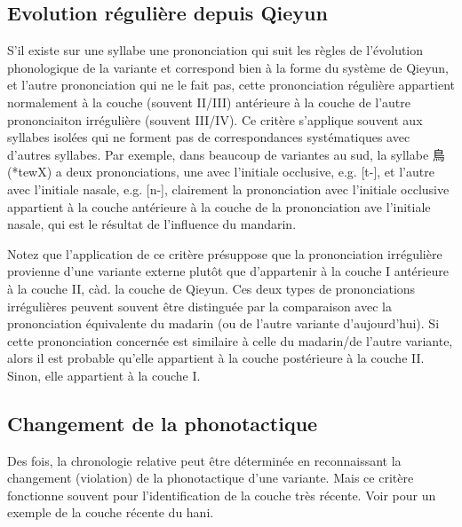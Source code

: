 \documentclass{scrbook}
\newcounter{c}[subsubsection]
\begin{document}
\begin{sloppypar}
\subsection{Evolution régulière depuis Qieyun}
S'il existe sur une syllabe une prononciation qui suit les règles de l'évolution phonologique de la variante et correspond bien à la forme du système de Qieyun, et l'autre prononciation qui ne le fait pas, cette prononciation régulière appartient normalement à la couche (souvent II/III) antérieure à la couche  de l'autre prononciaiton irrégulière (souvent III/IV). Ce critère s'applique souvent aux syllabes isolées qui ne forment pas de correspondances systématiques avec d'autres syllabes. Par exemple, dans beaucoup de variantes au sud, la syllabe 鳥 (*tewX) a deux prononciations, une avec l'initiale occlusive, e.g. [t-], et l'autre avec l'initiale nasale, e.g. [n-], clairement la prononciation avec l'initiale occlusive appartient à la couche antérieure à la couche de la prononciation ave l'initiale nasale, qui est le résultat de l'influence du mandarin. 

Notez que l'application de ce critère présuppose que la prononciation irrégulière provienne d'une variante externe plutôt que d'appartenir à la couche I antérieure à la couche II, càd. la couche de Qieyun. Ces deux types de prononciations irrégulières peuvent souvent être distinguée par la comparaison  avec la prononciation équivalente du madarin (ou de l'autre variante d'aujourd'hui). Si cette prononciation concernée est similaire à celle du madarin/de l'autre variante, alors il est probable qu'elle appartient à la couche postérieure à la couche II. Sinon, elle appartient à la couche I.

\subsection{Changement de la phonotactique}
Des fois, la chronologie relative peut être déterminée en reconnaissant la changement (violation) de la phonotactique d'une variante. Mais ce critère fonctionne souvent pour l'identification de la couche très récente. Voir \textcite[9--10]{Sagart2001hani} pour un exemple de la couche récente du hani.


\end{sloppypar}
\end{document}
